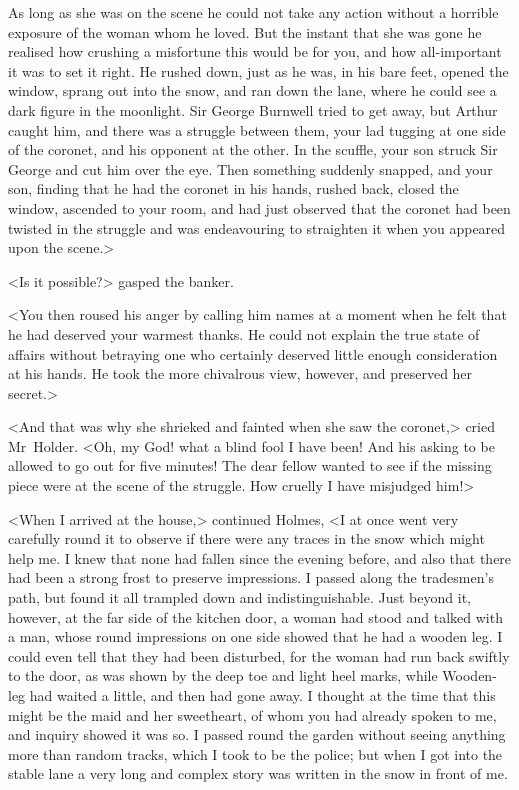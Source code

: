 As long as she was on the scene he could not take any action without a horrible exposure of the woman whom he loved. But the instant that she was gone he realised how crushing a misfortune this would be for you, and how all-important it was to set it right. He rushed down, just as he was, in his bare feet, opened the window, sprang out into the snow, and ran down the lane, where he could see a dark figure in the moonlight. Sir George Burnwell tried to get away, but Arthur caught him, and there was a struggle between them, your lad tugging at one side of the coronet, and his opponent at the other. In the scuffle, your son struck Sir George and cut him over the eye. Then something suddenly snapped, and your son, finding that he had the coronet in his hands, rushed back, closed the window, ascended to your room, and had just observed that the coronet had been twisted in the struggle and was endeavouring to straighten it when you appeared upon the scene.>

<Is it possible?> gasped the banker.

<You then roused his anger by calling him names at a moment when he felt that he had deserved your warmest thanks. He could not explain the true state of affairs without betraying one who certainly deserved little enough consideration at his hands. He took the more chivalrous view, however, and preserved her secret.>

<And that was why she shrieked and fainted when she saw the coronet,> cried Mr~Holder. <Oh, my God! what a blind fool I have been! And his asking to be allowed to go out for five minutes! The dear fellow wanted to see if the missing piece were at the scene of the struggle. How cruelly I have misjudged him!>

<When I arrived at the house,> continued Holmes, <I at once went very carefully round it to observe if there were any traces in the snow which might help me. I knew that none had fallen since the evening before, and also that there had been a strong frost to preserve impressions. I passed along the tradesmen's path, but found it all trampled down and indistinguishable. Just beyond it, however, at the far side of the kitchen door, a woman had stood and talked with a man, whose round impressions on one side showed that he had a wooden leg. I could even tell that they had been disturbed, for the woman had run back swiftly to the door, as was shown by the deep toe and light heel marks, while Wooden-leg had waited a little, and then had gone away. I thought at the time that this might be the maid and her sweetheart, of whom you had already spoken to me, and inquiry showed it was so. I passed round the garden without seeing anything more than random tracks, which I took to be the police; but when I got into the stable lane a very long and complex story was written in the snow in front of me.


